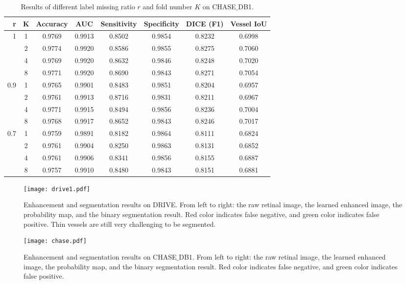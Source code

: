 \documentclass[runningheads]{llncs}
\begin{document}
\begin{table}[th]\setlength{\tabcolsep}{6pt}
\centering
\footnotesize
\caption{Results of different label missing ratio $r$ and fold number $K$ on CHASE$\_$DB1. }
\begin{tabular}{|r|c|c|c|c|c|c|c|}
\hline
r& K & Accuracy & AUC & Sensitivity & Specificity &   DICE (F1) &Vessel IoU  \\ \hline\hline
1&1&0.9769&0.9913&0.8502&0.9854&0.8232&0.6998\\ \hline
&2&0.9774&0.9920&0.8586&0.9855&0.8275&0.7060\\ \hline
&4&0.9769&0.9920&0.8632&0.9846&0.8248&0.7020\\ \hline
&8&0.9771&0.9920&0.8690&0.9843&0.8271&0.7054\\ \hline\hline
0.9&1&0.9765&0.9901&0.8483&0.9851&0.8204&0.6957\\ \hline
&2&0.9761&0.9913&0.8716&0.9831&0.8211&0.6967\\ \hline
&4&0.9771&0.9915&0.8494&0.9856&0.8236&0.7004\\ \hline
&8&0.9768&0.9917&0.8652&0.9843&0.8246&0.7017\\ \hline\hline
0.7&1&0.9759&0.9891&0.8182&0.9864&0.8111&0.6824\\ \hline
&2&0.9761&0.9904&0.8250&0.9863&0.8131&0.6852\\ \hline
&4&0.9761&0.9906&0.8341&0.9856&0.8155&0.6887\\ \hline
&8&0.9757&0.9910&0.8480&0.9843&0.8151&0.6881\\ \hline
\end{tabular}\label{exp:chase_full}
\end{table}
\begin{figure}[th]\centering
\texttt{[image: drive1.pdf]}
\caption{Enhancement and segmentation results on DRIVE. From left to right: the raw retinal image, the learned enhanced image, the probability map, and the binary segmentation result. Red color indicates false negative, and green color indicates false positive. Thin vessels are still very challenging to be segmented. }
  \label{fig:drive2}
\end{figure}
\clearpage
\begin{figure}[th]\centering
\texttt{[image: chase.pdf]}
\caption{Enhancement and segmentation results on CHASE$\_$DB1. From left to right: the raw retinal image, the learned enhanced image, the probability map, and the binary segmentation result. Red color indicates false negative, and green color indicates false positive. }
  \label{fig:chase}
\end{figure}
\clearpage




\end{document}
